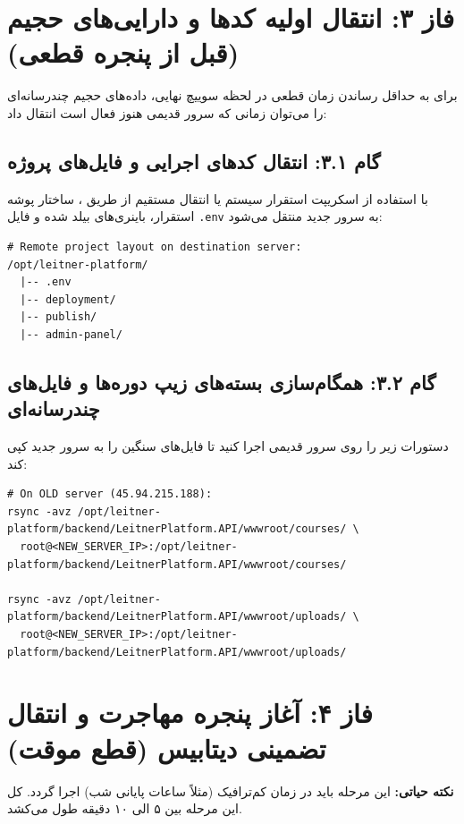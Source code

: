 \documentclass[11pt,a4paper]{article}
\begin{document}
\section{فاز ۳: انتقال اولیه کدها و دارایی‌های حجیم (قبل از پنجره قطعی)}
برای به حداقل رساندن زمان قطعی در لحظه سوییچ نهایی، داده‌های حجیم چندرسانه‌ای را می‌توان زمانی که سرور قدیمی هنوز فعال است انتقال داد:

\subsection{گام ۳.۱: انتقال کدهای اجرایی و فایل‌های پروژه}
با استفاده از اسکریپت استقرار سیستم یا انتقال مستقیم از طریق ، ساختار پوشه استقرار، باینری‌های بیلد شده و فایل \verb|.env| به سرور جدید منتقل می‌شود:
\begin{latin}
\small
\begin{verbatim}
# Remote project layout on destination server:
/opt/leitner-platform/
  |-- .env
  |-- deployment/
  |-- publish/
  |-- admin-panel/
\end{verbatim}
\end{latin}

\subsection{گام ۳.۲: همگام‌سازی بسته‌های زیپ دوره‌ها و فایل‌های چندرسانه‌ای}
دستورات زیر را روی سرور قدیمی اجرا کنید تا فایل‌های سنگین را به سرور جدید کپی کند:
\begin{latin}
\small
\begin{verbatim}
# On OLD server (45.94.215.188):
rsync -avz /opt/leitner-platform/backend/LeitnerPlatform.API/wwwroot/courses/ \
  root@<NEW_SERVER_IP>:/opt/leitner-platform/backend/LeitnerPlatform.API/wwwroot/courses/

rsync -avz /opt/leitner-platform/backend/LeitnerPlatform.API/wwwroot/uploads/ \
  root@<NEW_SERVER_IP>:/opt/leitner-platform/backend/LeitnerPlatform.API/wwwroot/uploads/
\end{verbatim}
\end{latin}

\section{فاز ۴: آغاز پنجره مهاجرت و انتقال تضمینی دیتابیس (قطع موقت)}
\textbf{نکته حیاتی:} این مرحله باید در زمان کم‌ترافیک (مثلاً ساعات پایانی شب) اجرا گردد. کل این مرحله بین ۵ الی ۱۰ دقیقه طول می‌کشد.
\end{document}

